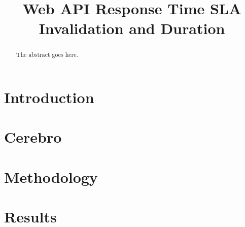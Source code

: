 \documentclass[conference,compsoc]{IEEEtran}
\begin{document}
%
\title{Web API Response Time SLA Invalidation and Duration}

\author{
}

\maketitle


\begin{abstract}
The abstract goes here.
\end{abstract}

\vspace{-0.1in}
\section{Introduction}
\vspace{-0.1in}
\label{sec:intro}


\vspace{-0.1in}
\section{Cerebro}
\vspace{-0.1in}
\label{sec:cerebro}


\vspace{-0.1in}
\section{Methodology}
\vspace{-0.1in}
\label{sec:methodology}


\vspace{-0.1in}
\section{Results}
\vspace{-0.1in}
\label{sec:results}


\vspace{-0.1in}
\end{document}
